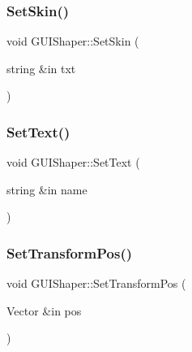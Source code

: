\hypertarget{class_g_u_i_shaper_afe6bad1dc1465de85c7ddb8444d30f2c}{}\label{class_g_u_i_shaper_afe6bad1dc1465de85c7ddb8444d30f2c} 
\subsubsection{\texorpdfstring{Set\+Skin()}{SetSkin()}}
{\footnotesize\ttfamily void G\+U\+I\+Shaper\+::\+Set\+Skin (\begin{DoxyParamCaption}\item[{string \&in}]{txt }\end{DoxyParamCaption})}

\hypertarget{class_g_u_i_shaper_a25905d0edf0b709e25e64677654b0210}{}\label{class_g_u_i_shaper_a25905d0edf0b709e25e64677654b0210} 
\subsubsection{\texorpdfstring{Set\+Text()}{SetText()}}
{\footnotesize\ttfamily void G\+U\+I\+Shaper\+::\+Set\+Text (\begin{DoxyParamCaption}\item[{string \&in}]{name }\end{DoxyParamCaption})}

\hypertarget{class_g_u_i_shaper_ab4227f4e7896ef5ecf915c18adfcf026}{}\label{class_g_u_i_shaper_ab4227f4e7896ef5ecf915c18adfcf026} 
\subsubsection{\texorpdfstring{Set\+Transform\+Pos()}{SetTransformPos()}}
{\footnotesize\ttfamily void G\+U\+I\+Shaper\+::\+Set\+Transform\+Pos (\begin{DoxyParamCaption}\item[{Vector \&in}]{pos }\end{DoxyParamCaption})}

\hypertarget{class_g_u_i_shaper_a7d7781cc70278569363830f0ac0ff06c}{}\label{class_g_u_i_shaper_a7d7781cc70278569363830f0ac0ff06c} 
